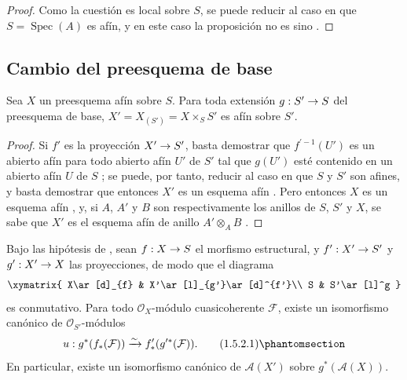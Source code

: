 \documentclass[oneside,10pt]{amsart}
\makeatletter
\newcommand{\ega@arrow}[2]{\mathchoice{#1}{#2}{#2}{#2}}
\renewcommand{\to}{\ega@arrow{\longrightarrow}{\rightarrow}}
\let\EGAOriginalLabel\label
\renewcommand{\label}[1]{\phantomsection\EGAOriginalLabel{#1}}
\makeatother
\begin{document}
\begin{proof}
Como la cuestión es local sobre $S$, se puede reducir al caso en que $S=\operatorname{Spec}(A)$ es afín, y en este caso la proposición no es sino .
\end{proof}

\subsection{Cambio del preesquema de base}
\label{II.1.5-fr}

\begin{proposition}[1.5.1]
\label{II.1.5.1-fr}
Sea $X$ un preesquema afín sobre $S$.
Para toda extensión $g:S'\to S$ del preesquema de base, $X'=X_{(S')}=X\times_S S'$ es afín sobre $S'$.
\end{proposition}

\begin{proof}
Si $f'$ es la proyección $X'\to S'$, basta demostrar que $f^{\prime-1}(U')$ es un abierto afín para todo abierto afín $U'$ de $S'$ tal que $g(U')$ esté contenido en un abierto afín $U$ de $S$ ; se puede, por tanto, reducir al caso en que $S$ y $S'$ son afines, y basta demostrar que entonces $X'$ es un esquema afín .
Pero entonces $X$ es un esquema afín , y, si $A$, $A'$ y $B$ son respectivamente los anillos de $S$, $S'$ y $X$, se sabe que $X'$ es el esquema afín de anillo $A'\otimes_A B$ .
\end{proof}

\begin{corollary}[1.5.2]
\label{II.1.5.2-fr}
Bajo las hipótesis de , sean $f:X\to S$ el morfismo estructural, y $f':X'\to S'$ y $g':X'\to X$ las proyecciones, de modo que el diagrama
\[
  \xymatrix{
    X\ar[d]_{f} & X'\ar[l]_{g'}\ar[d]^{f'}\\
    S & S'\ar[l]^g
  }
\]
es conmutativo.
Para todo $\mathcal{O}_X$-módulo cuasicoherente $\mathcal{F}$, existe un isomorfismo canónico de $\mathcal{O}_{S'}$-módulos
\[
  u:g^*(f_*(\mathcal{F}))\xrightarrow{\sim}
  f'_*(g^{\prime*}(\mathcal{F})).
  \tag{1.5.2.1}\label{II.1.5.2.1-fr}
\]
En particular, existe un isomorfismo canónico de $\mathcal{A}(X')$ sobre $g^*(\mathcal{A}(X))$.
\end{corollary}
\end{document}
